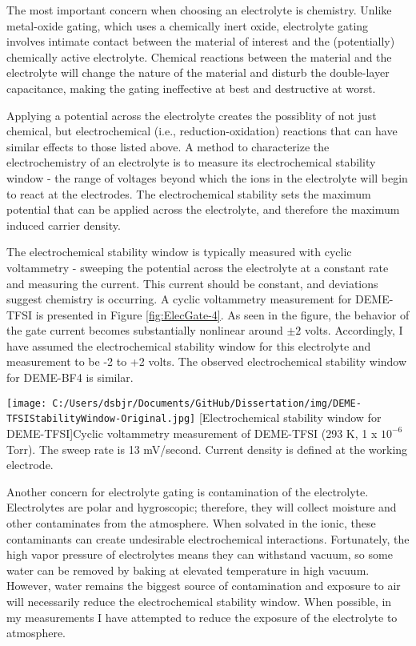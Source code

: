 The most important concern when choosing an electrolyte is chemistry. Unlike metal-oxide gating, which uses a chemically inert oxide, electrolyte gating involves intimate contact between the material of interest and the (potentially) chemically active electrolyte. Chemical reactions between the material and the electrolyte will change the nature of the material and disturb the double-layer capacitance, making the gating ineffective at best and destructive at worst. 

Applying a potential across the electrolyte creates the possiblity of not just chemical, but electrochemical (i.e., reduction-oxidation) reactions that can have similar effects to those listed above. A method to characterize the electrochemistry of an electrolyte is to measure its electrochemical stability window - the range of voltages beyond which the ions in the electrolyte will begin to react at the electrodes. The electrochemical stability sets the maximum potential that can be applied across the electrolyte, and therefore the maximum induced carrier density.

The electrochemical stability window is typically measured with cyclic voltammetry - sweeping the potential across the electrolyte at a constant rate and measuring the current. This current should be constant, and deviations suggest chemistry is occurring. A cyclic voltammetry measurement for DEME-TFSI is presented in Figure \ref{fig:ElecGate-4}. As seen in the figure, the behavior of the gate current becomes substantially nonlinear around $\pm 2$ volts. Accordingly, I have assumed the electrochemical stability window for this electrolyte and  measurement to be -2 to +2 volts. The observed electrochemical stability window for DEME-BF4 is similar.

\begin{centering}
\texttt{[image: C:/Users/dsbjr/Documents/GitHub/Dissertation/img/DEME-TFSIStabilityWindow-Original.jpg]}
  \captionsetup{width=0.75\textwidth}
  [Electrochemical stability window for DEME-TFSI]{Cyclic voltammetry measurement of DEME-TFSI (293 K, 1 x $10^{-6}$ Torr). The sweep rate is 13 mV/second. Current density is defined at the working electrode.} 
  \label{fig:ElecGate-4}
\end{centering}

Another concern for electrolyte gating is contamination of the electrolyte. Electrolytes are polar and hygroscopic; therefore, they will collect moisture and other contaminates from the atmosphere. When solvated in the ionic, these contaminants can create undesirable electrochemical interactions. Fortunately, the high vapor pressure of electrolytes means they can withstand vacuum, so some water can be removed by baking at elevated temperature in high vacuum. However, water remains the biggest source of contamination and exposure to air will necessarily reduce the electrochemical stability window. When possible, in my measurements I have attempted to reduce the exposure of the electrolyte to atmosphere.

